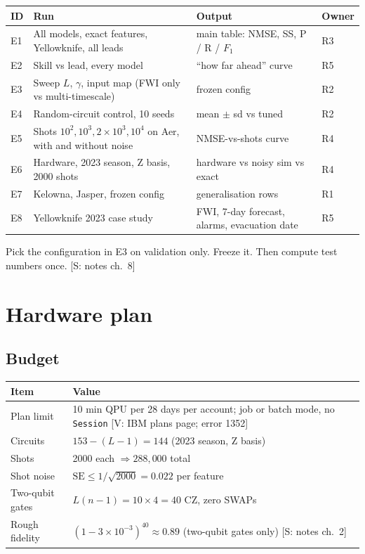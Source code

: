 \documentclass[11pt,a4paper]{article}
\newcommand{\tagbox}[2]{{\footnotesize\color{#1}\textsf{[#2]}}}
\newcommand{\supp}[1]{\tagbox{ForestGreen!70!black}{S: #1}}  %
\newcommand{\veri}[1]{\tagbox{ForestGreen!70!black}{V: #1}}  %
\newcommand{\code}[1]{\texttt{\small #1}}
\begin{document}
\begin{center}\small
\begin{tabularx}{\linewidth}{@{}l Y Y l@{}}
\toprule
\textbf{ID} & \textbf{Run} & \textbf{Output} & \textbf{Owner}\\
\midrule
E1 & All models, exact features, Yellowknife, all leads & main table: NMSE, SS, P / R / $F_1$ & R3\\
E2 & Skill vs lead, every model & ``how far ahead'' curve & R5\\
E3 & Sweep $L$, $\gamma$, input map (FWI only vs multi-timescale) & frozen config & R2\\
E4 & Random-circuit control, 10 seeds & mean $\pm$ sd vs tuned & R2\\
E5 & Shots $10^2,10^3,2{\times}10^3,10^4$ on Aer, with and without noise & NMSE-vs-shots curve & R4\\
E6 & Hardware, 2023 season, Z basis, 2000 shots & hardware vs noisy sim vs exact & R4\\
E7 & Kelowna, Jasper, frozen config & generalisation rows & R1\\
E8 & Yellowknife 2023 case study & FWI, 7-day forecast, alarms, evacuation date & R5\\
\bottomrule
\end{tabularx}
\end{center}

\begin{teamrule}
Pick the configuration in E3 on validation only. Freeze it. Then compute test numbers once. \supp{notes ch.~8}
\end{teamrule}

\section{Hardware plan}

\subsection{Budget}
\begin{center}\small
\begin{tabularx}{\linewidth}{@{}l Y@{}}
\toprule
\textbf{Item} & \textbf{Value}\\
\midrule
Plan limit & 10 min QPU per 28 days per account; job or batch mode, no \code{Session} \veri{IBM plans page; error 1352}\\
Circuits & $153-(L-1)=144$ (2023 season, Z basis)\\
Shots & 2000 each $\Rightarrow288{,}000$ total\\
Shot noise & $\mathrm{SE}\le1/\sqrt{2000}=0.022$ per feature\\
Two-qubit gates & $L(n-1)=10\times4=40$ CZ, zero SWAPs\\
Rough fidelity & $(1-3{\times}10^{-3})^{40}\approx0.89$ (two-qubit gates only) \supp{notes ch.~2}\\
\bottomrule
\end{tabularx}
\end{center}
\end{document}
